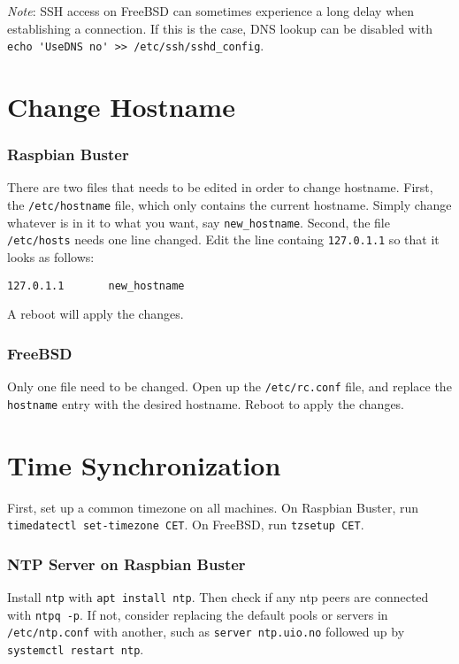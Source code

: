 \textit{Note}: SSH access on FreeBSD can sometimes experience a long delay when establishing a connection. If this is the case, DNS lookup can be disabled with \lstinline{echo 'UseDNS no' >> /etc/ssh/sshd_config}.


\section{Change Hostname} \label{change_hostname}

\subsubsection{Raspbian Buster}

There are two files that needs to be edited in order to change hostname. First, the \lstinline{/etc/hostname} file, which only contains the current hostname. Simply change whatever is in it to what you want, say \lstinline{new_hostname}. Second, the file \lstinline{/etc/hosts} needs one line changed. Edit the line containg \lstinline{127.0.1.1} so that it looks as follows:

\begin{verbatim}
127.0.1.1       new_hostname
\end{verbatim}

A reboot will apply the changes.

\subsubsection{FreeBSD}

Only one file need to be changed. Open up the \lstinline{/etc/rc.conf} file, and replace the \lstinline{hostname} entry with the desired hostname. Reboot to apply the changes.


\section{Time Synchronization} \label{time_sync}

First, set up a common timezone on all machines. On Raspbian Buster, run \lstinline{timedatectl set-timezone CET}. On FreeBSD, run \lstinline{tzsetup CET}.

\subsubsection{NTP Server on Raspbian Buster}

Install \lstinline{ntp} with \lstinline{apt install ntp}. Then check if any \gls{ntp} peers are connected with \lstinline{ntpq -p}. If not, consider replacing the default pools or servers in \lstinline{/etc/ntp.conf} with another, such as \lstinline{server ntp.uio.no} followed up by \lstinline{systemctl restart ntp}.

